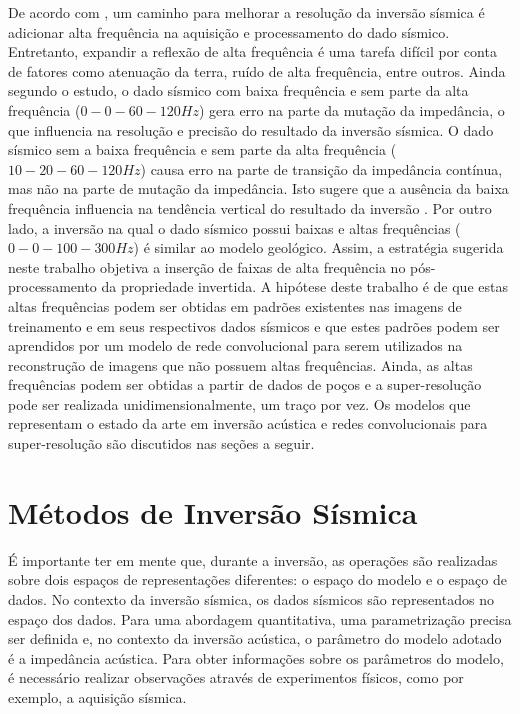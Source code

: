 De acordo com \cite{Xiaoyu2012}, um caminho
para melhorar a resolução da inversão sísmica é adicionar alta frequência
na aquisição e processamento do dado sísmico. Entretanto, expandir a reflexão de alta frequência é uma tarefa
difícil por conta de fatores como atenuação da terra, ruído de alta frequência, 
entre outros. Ainda segundo o estudo, o dado sísmico com baixa frequência e
sem parte da alta frequência ($0 - 0 - 60 - 120Hz$) gera erro na parte da mutação da impedância, o que
influencia na resolução e precisão do resultado da inversão sísmica. O dado sísmico
sem a baixa frequência e sem parte da alta frequência ($10 - 20 - 60 - 120Hz$) causa erro na parte de transição da impedância
contínua, mas não na parte de mutação da impedância. Isto sugere que a ausência da baixa frequência influencia
na tendência vertical do resultado da inversão \citep{Xiaoyu2012}. Por outro lado, a inversão na qual o dado sísmico possui baixas e
altas frequências ($0 - 0 - 100 - 300Hz$) é similar ao modelo geológico.
Assim, a estratégia sugerida neste trabalho objetiva a inserção de faixas de alta frequência no pós-processamento da propriedade invertida.
A hipótese deste trabalho é de que estas altas frequências podem ser obtidas em padrões existentes nas imagens de treinamento
e em seus respectivos dados sísmicos e que estes padrões podem ser aprendidos por um modelo de rede convolucional
para serem utilizados na reconstrução de imagens que não possuem altas frequências. Ainda, as altas frequências podem ser obtidas
a partir de dados de poços e a super-resolução pode ser realizada unidimensionalmente, um traço por vez.
Os modelos que representam o estado da arte em inversão acústica e redes convolucionais para super-resolução são discutidos nas seções a seguir.

\section{Métodos de Inversão Sísmica}
É importante ter em mente que, durante a inversão, as operações são realizadas
sobre dois espaços de representações diferentes: o espaço do modelo e o espaço de dados.
No contexto da inversão sísmica, os dados sísmicos são representados no espaço
dos dados. Para uma abordagem quantitativa, uma parametrização precisa ser definida \citep{tarantola} e,
no contexto da inversão acústica, o parâmetro do modelo adotado é a impedância acústica.
Para obter informações sobre os parâmetros do modelo, é necessário
realizar observações através de experimentos físicos, como por exemplo, a
aquisição sísmica.

